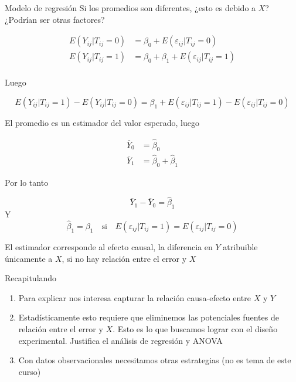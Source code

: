 \documentclass{beamer}
\begin{document}
\begin{frame}{Modelo de regresión}
Si los promedios son diferentes, ¿esto es debido a $X$? ¿Podrían ser otras factores?

\begin{align*}
    E(Y_{ij}|T_{ij}=0)&=\beta_0+E(\varepsilon_{ij}|T_{ij}=0)\\
    E(Y_{ij}|T_{ij}=1)&=\beta_0+\beta_1+E(\varepsilon_{ij}|T_{ij}=1)\\
    \end{align*}

    Luego

    \begin{equation*}
        E(Y_{ij}|T_{ij}=1)-E(Y_{ij}|T_{ij}=0)=\beta_1+E(\varepsilon_{ij}|T_{ij}=1)-E(\varepsilon_{ij}|T_{ij}=0)
    \end{equation*}

\end{frame}

\begin{frame}
    El promedio es un estimador del valor esperado, luego

    \begin{align*}
        \bar{Y}_0&=\hat{\beta}_0\\
        \bar{Y}_1&=\hat{\beta}_0+\hat{\beta}_1
    \end{align*}  

    Por lo tanto 

    \begin{equation*}
        \bar{Y}_1-\bar{Y}_0=\hat{\beta}_1
    \end{equation*}
    Y 
    \begin{equation*}
        \hat{\beta}_1=\beta_1 \quad \text{si}\quad E(\varepsilon_{ij}|T_{ij}=1)=E(\varepsilon_{ij}|T_{ij}=0)
    \end{equation*}

    El estimador corresponde al efecto causal, la diferencia en $Y$ atribuible únicamente a $X$, si no hay relación entre el error y $X$
\end{frame}

\begin{frame}{Recapitulando}

\begin{enumerate}
    \item Para explicar nos interesa capturar la relación causa-efecto entre $X$ y $Y$
    \item Estadísticamente esto requiere que eliminemos las potenciales fuentes de relación entre el error y $X$. Esto es lo que buscamos lograr con el diseño experimental. Justifica el análisis de regresión y ANOVA
    \item Con datos observacionales necesitamos otras estrategias (no es tema de este curso)
\end{enumerate}
    
\end{frame}
\end{document}

